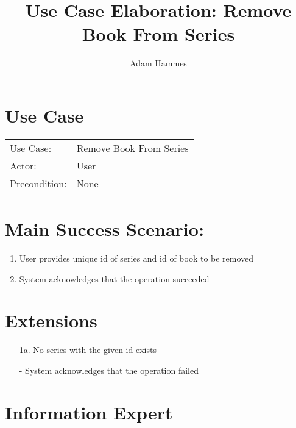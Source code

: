 \documentclass{article}
\title{Use Case Elaboration: Remove Book From Series}
\author{ Adam Hammes }
\begin{document}
\maketitle


\section*{Use Case}
\begin{tabular}{l l}
Use Case:     & Remove Book From Series\\
Actor:        & User \\
Precondition: & None\\
\end{tabular}


\section*{Main Success Scenario:}

\begin{enumerate}
    \item User provides unique id of series and id of book to be removed
    \item System acknowledges that the operation succeeded

\end{enumerate}

\section*{Extensions}

\begin{itemize}
    \item [1a.] No series with the given id exists

    - System acknowledges that the operation failed
                            
\end{itemize}


\section*{Information Expert}
\end{document}
